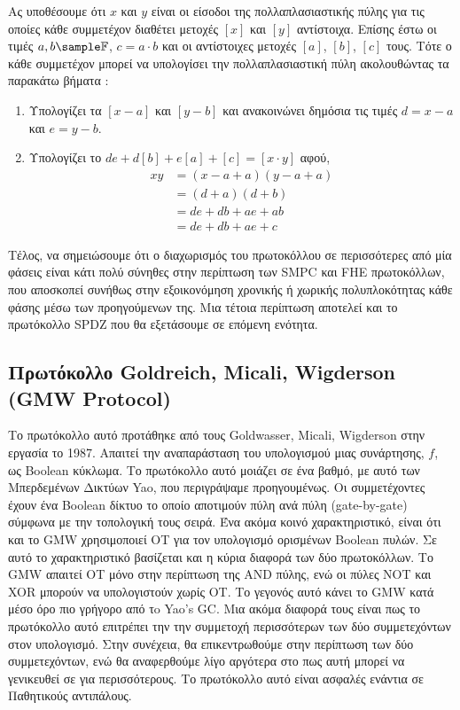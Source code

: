 Ας υποθέσουμε ότι $x$ και $y$ είναι οι είσοδοι της πολλαπλασιαστικής πύλης για τις οποίες κάθε συμμετέχον διαθέτει μετοχές $[x]$ και $[y]$ αντίστοιχα. Επίσης έστω οι τιμές $a, b \sample \mathbb{F}$, $c=a \cdot b$ και οι αντίστοιχες μετοχές $[a]$, $[b]$, $[c]$ τους. Τότε ο κάθε συμμετέχον μπορεί να υπολογίσει την πολλαπλασιαστική πύλη ακολουθώντας τα παρακάτω βήματα :

\begin{enumerate}
    \item Υπολογίζει τα $[x - a]$ και $[y - b]$ και ανακοινώνει δημόσια τις τιμές $d = x - a$ και $e = y - b$.
    \item Υπολογίζει το $de + d[b] + e[a] + [c] = [x \cdot y]$ αφού,
    \begin{align}
        xy &= (x - a + a)(y - a + a) \\
           &= (d + a)(d + b) \\
           &= de + db + ae + ab \\
           &= de + db + ae + c
    \end{align}
\end{enumerate}

Τέλος, να σημειώσουμε ότι ο διαχωρισμός του πρωτοκόλλου σε περισσότερες από μία φάσεις είναι κάτι πολύ σύνηθες στην περίπτωση των SMPC και FHE πρωτοκόλλων, που αποσκοπεί συνήθως στην εξοικονόμηση χρονικής ή χωρικής πολυπλοκότητας κάθε φάσης μέσω των προηγούμενων της. Μια τέτοια περίπτωση αποτελεί και το πρωτόκολλο SPDZ που θα εξετάσουμε σε επόμενη ενότητα.

\subsection{Πρωτόκολλο Goldreich, Micali, Wigderson (GMW Protocol)}

Το πρωτόκολλο αυτό προτάθηκε από τους Goldwasser, Micali, Wigderson στην εργασία \cite{goldreich2019play} το 1987. Απαιτεί την αναπαράσταση του υπολογισμού μιας συνάρτησης, $f$, ως Boolean κύκλωμα. Το πρωτόκολλο αυτό μοιάζει σε ένα βαθμό, με αυτό των Μπερδεμένων Δικτύων Yao, που περιγράψαμε προηγουμένως. Οι συμμετέχοντες έχουν ένα Boolean δίκτυο το οποίο αποτιμούν πύλη ανά πύλη (gate-by-gate) σύμφωνα με την τοπολογική τους σειρά. Ένα ακόμα κοινό χαρακτηριστικό, είναι ότι και το GMW χρησιμοποιεί OT για τον υπολογισμό ορισμένων Boolean πυλών. Σε αυτό το χαρακτηριστικό βασίζεται και η κύρια διαφορά των δύο πρωτοκόλλων. Το GMW απαιτεί ΟΤ μόνο στην περίπτωση της AND πύλης, ενώ οι πύλες NOT και XOR μπορούν να υπολογιστούν χωρίς OT. Το γεγονός αυτό κάνει το GMW κατά μέσο όρο πιο γρήγορο από τo Yao's GC. Μια ακόμα διαφορά τους είναι πως το πρωτόκολλο αυτό επιτρέπει την την συμμετοχή περισσότερων των δύο συμμετεχόντων στον υπολογισμό. Στην συνέχεια, θα επικεντρωθούμε στην περίπτωση των δύο συμμετεχόντων, ενώ θα αναφερθούμε λίγο αργότερα στο πως αυτή μπορεί να γενικευθεί σε για περισσότερους. Το πρωτόκολλο αυτό είναι ασφαλές ενάντια σε Παθητικούς αντιπάλους.

